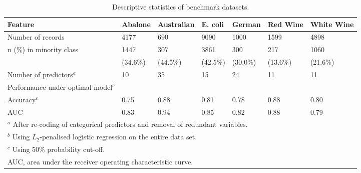 \begin{table}[ht]
\centering
\caption{Descriptive statistics of benchmark datasets.} 
\label{tab:datasets}
\begin{tabular}{lllllll}
  \hline
Feature & Abalone & Australian & E. coli & German & Red Wine & White Wine \\ 
  \hline
Number of records & 4177 & 690 & 9090 & 1000 & 1599 & 4898 \\ 
  n (\%) in minority class & 1447 & 307 & 3861 & 300 & 217 & 1060 \\ 
   & (34.6\%) & (44.5\%) & (42.5\%) & (30.0\%) & (13.6\%) & (21.6\%) \\ 
  Number of predictors$^a$ & 10 & 35 & 15 & 24 & 11 & 11 \\ 
  Performance under optimal model$^b$ &  &  &  &  &  &  \\ 
  \hspace{0.3cm} Accuracy$^c$ & 0.75 & 0.88 & 0.81 & 0.78 & 0.88 & 0.80 \\ 
  \hspace{0.3cm} AUC & 0.83 & 0.94 & 0.85 & 0.82 & 0.88 & 0.79 \\ 
   \hline \multicolumn{7}{l}{\small $^{a}$ After re-coding of categorical predictors and removal of redundant variables.} \\ \multicolumn{7}{l}{\small $^{b}$ Using $L_2$-penalised logistic regression on the entire data set.} \\ \multicolumn{7}{l}{\small $^{c}$ Using 50\% probability cut-off.} \\ \multicolumn{7}{l}{\small AUC, area under the receiver operating characteristic curve.} \\ \hline
\end{tabular}
\end{table}
